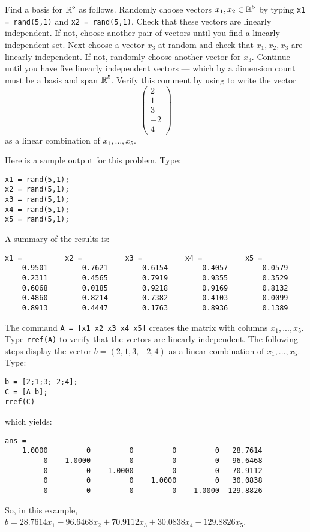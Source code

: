 \documentclass{ximera}
\begin{document}
\begin{computerExercise} \label{c5.6.5}
Find a basis for $\mbox{$\Bbb{R}$}^5$ as follows.  Randomly choose vectors $x_1,x_2\in\mbox{$\Bbb{R}$}^5$
by typing {\tt x1 = rand(5,1)} and {\tt x2 = rand(5,1)}.  Check that these
vectors are linearly independent.  If not, choose another pair of vectors
until you find a linearly independent set.  Next choose a vector $x_3$ at
random and check that $x_1,x_2,x_3$ are linearly independent.  If not,
randomly choose another vector for $x_3$. Continue until you have five
linearly independent vectors --- which by a dimension count must be a
basis and span $\mbox{$\Bbb{R}$}^5$.  Verify this comment by using \Matlab
to write the vector
\[
\left(\begin{array}{r} 2 \\ 1 \\ 3\\ -2 \\ 4 \end{array}\right)
\]
as a linear combination of $x_1,\ldots,x_5$.

\begin{solution}

Here is a sample \Matlab output for this problem.  Type:
\begin{verbatim}
x1 = rand(5,1);
x2 = rand(5,1);
x3 = rand(5,1);
x4 = rand(5,1);
x5 = rand(5,1);
\end{verbatim}
A summary of the results is:
\begin{verbatim}
x1 =          x2 =          x3 =          x4 =          x5 =
    0.9501        0.7621        0.6154        0.4057        0.0579
    0.2311        0.4565        0.7919        0.9355        0.3529
    0.6068        0.0185        0.9218        0.9169        0.8132
    0.4860        0.8214        0.7382        0.4103        0.0099
    0.8913        0.4447        0.1763        0.8936        0.1389
\end{verbatim}
The command {\tt A = [x1 x2 x3 x4 x5]} creates the matrix with columns
$x_1,...,x_5$.  Type {\tt rref(A)} to verify that the vectors are
linearly independent.  The following steps display the vector
$b = (2,1,3,-2,4)$ as a linear combination of $x_1,...,x_5$.  Type:
\begin{verbatim}
b = [2;1;3;-2;4];
C = [A b];
rref(C)
\end{verbatim}
which yields:

\begin{verbatim}
ans =
    1.0000         0         0         0         0   28.7614
         0    1.0000         0         0         0  -96.6468
         0         0    1.0000         0         0   70.9112
         0         0         0    1.0000         0   30.0838
         0         0         0         0    1.0000 -129.8826
\end{verbatim}
So, in this example, $b = 28.7614x_1 - 96.6468x_2 + 70.9112x_3
+ 30.0838x_4 - 129.8826x_5$.

\end{solution}
\end{computerExercise}
\end{document}
